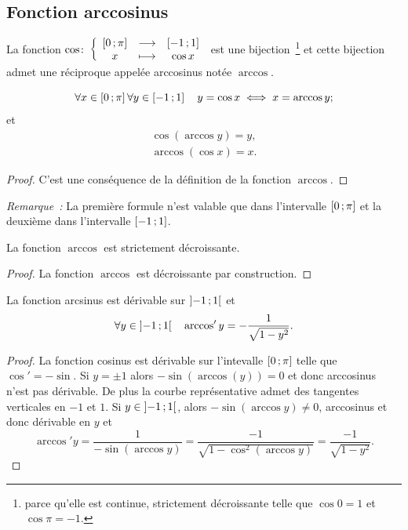 \subsection{Fonction arccosinus}
\label{subsec:chap1-fonctionarccos}
\begin{defdef}
  La fonction $\cos\colon \left\{\begin{array}{ccc} \left[ 0 \, ;  \pi \right] & \longrightarrow &\left[ -1 \, ;  1 \right]\\ x & \longmapsto & \cos x \end{array} \right.$ est une bijection~\footnote{parce qu'elle est continue, strictement décroissante telle que $\cos 0=1$ et $\cos \pi=-1$.} et cette bijection admet une réciproque appelée arccosinus notée $\arccos$.
\end{defdef}
%
\begin{prop} 
  \begin{equation} 
    \forall x \in \left[ 0 \, ;  \pi \right] \forall y \in \left[ -1 \, ;  1 \right] \quad y = \cos x \iff x = \arccos y;
  \end{equation} 
  et 
  \begin{gather} 
    \cos(\arccos y) = y, \\ 
    \arccos(\cos x) = x.
  \end{gather}
\end{prop}
\begin{proof} 
  C'est une conséquence de la définition de la fonction $\arccos$. 
\end{proof}
%
\emph{Remarque~:} La première formule n'est valable que dans l'intervalle $\left[ 0 \, ;  \pi \right]$ et la deuxième dans l'intervalle $\left[ -1 \, ;  1 \right]$.
\begin{prop} 
  La fonction $\arccos$ est strictement décroissante. 
\end{prop}
\begin{proof} 
  La fonction $\arccos$ est décroissante par construction.
\end{proof}
%
\begin{prop} 
  La fonction arcsinus est dérivable sur $\left] -1 \, ;  1 \right[$ et 
  \begin{equation}
    \forall y \in \left] -1 \, ;  1 \right[ \quad \arccos'y = -\frac{1}{\sqrt{1-y^2}}.
  \end{equation} 
\end{prop}
\begin{proof} 
  La fonction cosinus est dérivable sur l'intevalle $\left[ 0 \, ;  \pi \right]$ telle que $\cos'=-\sin$. Si $y=\pm 1$ alors $-\sin(\arccos(y))=0$  et donc arccosinus n'est pas dérivable. De plus la courbe représentative admet des tangentes verticales en $-1$ et $1$. Si $y \in \left] -1 \, ;  1 \right[$, alors $-\sin(\arccos y) \neq 0$, arccosinus et donc dérivable en $y$ et 
  \begin{equation} 
    \arccos' y = \frac{1}{-\sin( \arccos y)}=\frac{-1}{\sqrt{1-\cos^2(\arccos y)}}=\frac{-1}{\sqrt{1-y^2}}.
  \end{equation} 
\end{proof}
